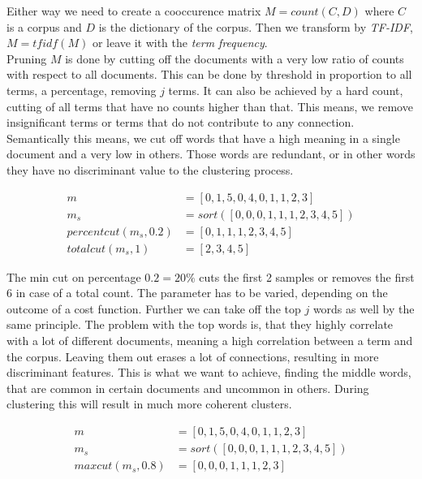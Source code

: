     Either way we need to create a cooccurence matrix $M = count(C, D)$ where $C$ is a corpus and $D$ is the dictionary of the corpus. Then we transform by \emph{TF-IDF}, $M = tfidf(M)$ or leave it with the \emph{term frequency}.\\

    Pruning $M$ is done by cutting off the documents with a very low ratio of counts with respect to all documents. This can be done by threshold in proportion to all terms, a percentage, removing $j$ terms. It can also be achieved by a hard count, cutting of all terms that have no counts higher than that. This means, we remove insignificant terms or terms that do not contribute to any connection. Semantically this means, we cut off words that have a high meaning in a single document and a very low in others. Those words are redundant, or in other words they have no discriminant value to the clustering process.

      \begin{equation}
      \begin{split}
        m &= [0, 1, 5, 0, 4, 0, 1, 1, 2, 3] \\
        m_s &= sort( [0, 0, 0, 1, 1, 1, 2, 3, 4, 5] ) \\
        percentcut(m_s, 0.2) &= [0, 1, 1, 1, 2, 3, 4, 5] \\
        totalcut(m_s, 1) &= [2, 3, 4, 5]
      \end{split}
      \end{equation}

    The min cut on percentage $0.2 = 20\%$ cuts the first 2 samples or removes the first 6 in case of a total count. The parameter has to be varied, depending on the outcome of a cost function. Further we can take off the top $j$ words as well by the same principle. The problem with the top words is, that they highly correlate with a lot of different documents, meaning a high correlation between a term and the corpus. Leaving them out erases a lot of connections, resulting in more discriminant features. This is what we want to achieve, finding the middle words, that are common in certain documents and uncommon in others. During clustering this will result in much more coherent clusters.

      \begin{equation}
      \begin{split}
        m &= [0, 1, 5, 0, 4, 0, 1, 1, 2, 3] \\
        m_s &= sort( [0, 0, 0, 1, 1, 1, 2, 3, 4, 5] ) \\
        maxcut(m_s, 0.8) &= [0, 0, 0, 1, 1, 1, 2, 3]
      \end{split}
      \end{equation}


